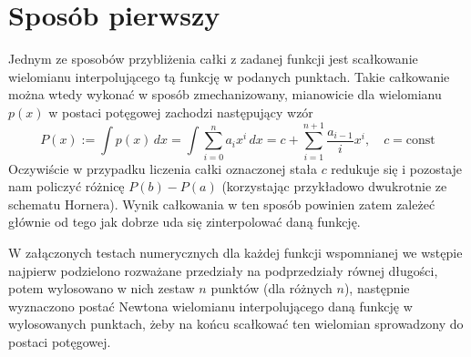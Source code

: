 \documentclass[11pt,wide,leqno]{article}
\begin{document}
    \section{Sposób pierwszy}
        Jednym ze sposobów przybliżenia całki z zadanej funkcji
        jest scałkowanie wielomianu interpolującego tą funkcję w podanych punktach. 
        Takie całkowanie można wtedy wykonać w sposób zmechanizowany, mianowicie dla wielomianu \(p(x)\)
        w postaci potęgowej zachodzi następujący wzór
        \begin{equation}
            P(x) := \int p(x)\,dx = \int \sum_{i=0}^{n} a_i x^i \,dx =
            c + \sum_{i=1}^{n+1} \frac{a_{i-1}}{i} x^{i}, \quad c = \text{const}
        \end{equation}
        Oczywiście w przypadku liczenia całki oznaczonej stała \(c\) redukuje się i pozostaje nam
        policzyć różnicę \(P(b) - P(a)\) (korzystając przykładowo dwukrotnie ze schematu Hornera).
        Wynik całkowania w ten sposób powinien zatem zależeć głównie od tego jak dobrze uda się 
        zinterpolować daną funkcję.

        W załączonych testach numerycznych dla każdej funkcji wspomnianej we wstępie najpierw podzielono rozważane przedziały na podprzedziały równej długości, potem wylosowano w nich
        zestaw \(n\) punktów (dla różnych \(n\)), następnie wyznaczono postać Newtona wielomianu interpolującego daną funkcję w 
        wylosowanych punktach, żeby na końcu scałkować ten wielomian sprowadzony do postaci potęgowej.
\end{document}
